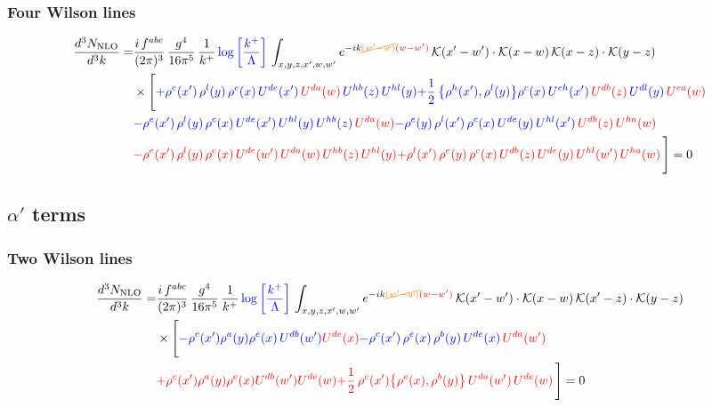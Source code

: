 \documentclass[9pt]{article}
\numberwithin{equation}{section}
\begin{document}
\subsubsection{Four Wilson lines}
\begin{align}
\frac{d^{3}N_{\rm NLO}}{d^{3}k} = &\frac{i\,f^{abc}}{(2\pi)^{3}}\,\frac{g^{4}}{16\pi^{5}}\,\frac{1}{k^{+}}\,{\color{blue}\log{\left[\frac{k^{+}}{\Lambda}\right]}}\,\int_{x,y,z,x',w,w'}e^{-ik{\color{orange}\cancel{(w'-w)}}{\color{red}(w-w')}}\,\mathcal{K}(x'-w')\cdot\mathcal{K}(x-w)\,\mathcal{K}(x-z)\cdot\mathcal{K}(y-z)\notag\\
&\times\Bigg[{\color{blue}+\rho^{e}(x')\, \rho^{l}(y)\,\rho^{c}(x)\, U^{de}(x')\,{\color{red}U^{da}(w)}\,U^{hb}(z)\,U^{hl}(y)}{\color{blue}+\frac{1}{2}\,\big\{\rho^{h}(x'),\rho^{l}(y)\big\}\rho^{c}(x)\,U^{eh}(x')\,{\color{red}U^{db}(z)}\,U^{dl}(y)\,{\color{red}U^{ea}(w)}}\notag \\
&{\color{blue}-\rho^{e}(x')\,\rho^{l}(y)\,\rho^{c}(x)\,U^{de}(x')\,U^{hl}(y)\,U^{hb}(z)\,{\color{red}U^{da}(w)}}{\color{blue}-\rho^{e}(y)\,\rho^{l}(x')\,\rho^{c}(x)\,U^{de}(y)\,U^{hl}(x')\,{\color{red}U^{db}(z)}\,{\color{red}U^{ha}(w)}} \notag \\ &{\color{red}-\rho^{e}(x')\, \rho^{l}(y)\,\rho^{c}(x)\, U^{de}(w')\,{\color{red}U^{da}(w)}\,U^{hb}(z)\,U^{hl}(y)}{\color{red}+\rho^{l}(x')\,\rho^{e}(y)\,\rho^{c}(x)\,{\color{red}U^{db}(z)}\,U^{de}(y)\,U^{hl}(w')\,{\color{red}U^{ha}(w)}}\,\Bigg] = 0
\end{align}
\subsection{$\alpha'$ terms}
\subsubsection{Two Wilson lines}
\begin{align}
\frac{d^{3}N_{\rm NLO}}{d^{3}k}= & \frac{i\,f^{abc}}{(2\pi)^{3}}\,\frac{g^{4}}{16\pi^{5}}\,\frac{1}{k^{+}}\,{\color{blue}\log{\left[\frac{k^{+}}{\Lambda}\right]}}\,\int_{x,y,z,x',w,w'}e^{-ik{\color{orange}\cancel{(w'-w)}}{\color{red}(w-w')}}\,\mathcal{K}(x'-w')\cdot\mathcal{K}(x-w)\,\mathcal{K}(x'-z)\cdot\mathcal{K}(y-z)\notag \\ & \times\Bigg[ {\color{blue}-\rho^{c}(x') \rho^{a}(y) \rho^{e}(x)\,U^{d b}(w') {\color{red}U^{de}(x)}}{\color{blue}-\rho^{c}(x')\,\rho^{e}(x)\,\rho^{b}(y)\,U^{de}(x)\,{\color{red}U^{da}(w')}}\notag \\
&{\color{red}+\rho^{c}(x') \rho^{a}(y) \rho^{e}(x) {\color{red}U^{db}(w')} {\color{red}U^{de}(w)}}{\color{red}+\frac{1}{2}\,\rho^{c}(x')\big\{\rho^{e}(x),\rho^{b}(y)\big\}\,{\color{red}U^{da}(w')}\,U^{de}(w)}\,\Bigg] = 0
\end{align}
\end{document}
